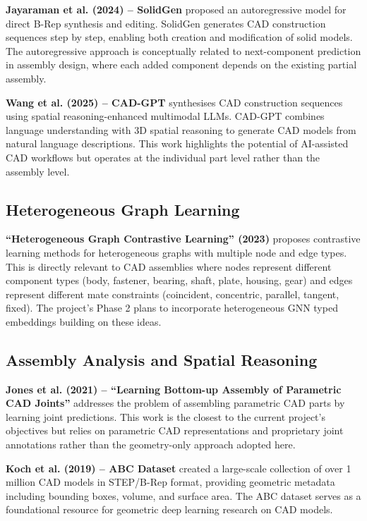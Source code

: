 \documentclass[12pt]{report}
\begin{document}
\textbf{Jayaraman et al. (2024) -- SolidGen} proposed an autoregressive model for direct B-Rep synthesis and editing. SolidGen generates CAD construction sequences step by step, enabling both creation and modification of solid models. The autoregressive approach is conceptually related to next-component prediction in assembly design, where each added component depends on the existing partial assembly.

\textbf{Wang et al. (2025) -- CAD-GPT} synthesises CAD construction sequences using spatial reasoning-enhanced multimodal LLMs. CAD-GPT combines language understanding with 3D spatial reasoning to generate CAD models from natural language descriptions. This work highlights the potential of AI-assisted CAD workflows but operates at the individual part level rather than the assembly level.

\subsection{Heterogeneous Graph Learning}

\textbf{``Heterogeneous Graph Contrastive Learning'' (2023)} proposes contrastive learning methods for heterogeneous graphs with multiple node and edge types. This is directly relevant to CAD assemblies where nodes represent different component types (body, fastener, bearing, shaft, plate, housing, gear) and edges represent different mate constraints (coincident, concentric, parallel, tangent, fixed). The project's Phase 2 plans to incorporate heterogeneous GNN typed embeddings building on these ideas.

\subsection{Assembly Analysis and Spatial Reasoning}

\textbf{Jones et al. (2021) -- ``Learning Bottom-up Assembly of Parametric CAD Joints''} addresses the problem of assembling parametric CAD parts by learning joint predictions. This work is the closest to the current project's objectives but relies on parametric CAD representations and proprietary joint annotations rather than the geometry-only approach adopted here.

\textbf{Koch et al. (2019) -- ABC Dataset} created a large-scale collection of over 1 million CAD models in STEP/B-Rep format, providing geometric metadata including bounding boxes, volume, and surface area. The ABC dataset serves as a foundational resource for geometric deep learning research on CAD models.
\end{document}

